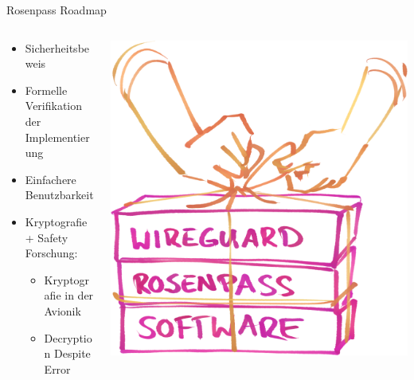 \documentclass[german]{rosenpass-beamer}
\begin{document}
\begin{frame}[fragile]{Rosenpass Roadmap}
\begin{columns}[c]
\begin{column}{0.7\textwidth}
\begin{itemize}
  \item Sicherheitsbeweis
  \item Formelle Verifikation der Implementierung
  \item Einfachere Benutzbarkeit

  \item  Kryptografie + Safety Forschung:
  \begin{itemize}
    \item Kryptografie in der Avionik
    \item Decryption Despite Error
  \end{itemize}
\end{itemize}
\end{column}

\begin{column}{0.2\textwidth}
\includegraphics[width=\linewidth]{graphics/rosenpass in anderen apps.png}


\end{column}
\end{columns}
\end{frame}
\end{document}
